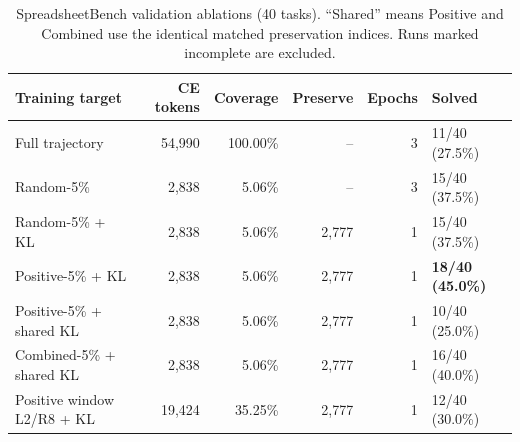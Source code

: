 \begin{table}[t]
\caption{SpreadsheetBench validation ablations (40 tasks).  ``Shared'' means Positive and Combined use the identical matched preservation indices.  Runs marked incomplete are excluded.}
\label{tab:validation}
\centering
\small
\begin{tabular}{lrrrrl}
\toprule
Training target & CE tokens & Coverage & Preserve & Epochs & Solved \\
\midrule
Full trajectory & 54,990 & 100.00\% & -- & 3 & 11/40 (27.5\%) \\
Random-5\% & 2,838 & 5.06\% & -- & 3 & 15/40 (37.5\%) \\
Random-5\% + KL & 2,838 & 5.06\% & 2,777 & 1 & 15/40 (37.5\%) \\
Positive-5\% + KL & 2,838 & 5.06\% & 2,777 & 1 & \textbf{18/40 (45.0\%)} \\
Positive-5\% + shared KL & 2,838 & 5.06\% & 2,777 & 1 & 10/40 (25.0\%) \\
Combined-5\% + shared KL & 2,838 & 5.06\% & 2,777 & 1 & 16/40 (40.0\%) \\
Positive window L2/R8 + KL & 19,424 & 35.25\% & 2,777 & 1 & 12/40 (30.0\%) \\
\bottomrule
\end{tabular}
\end{table}
